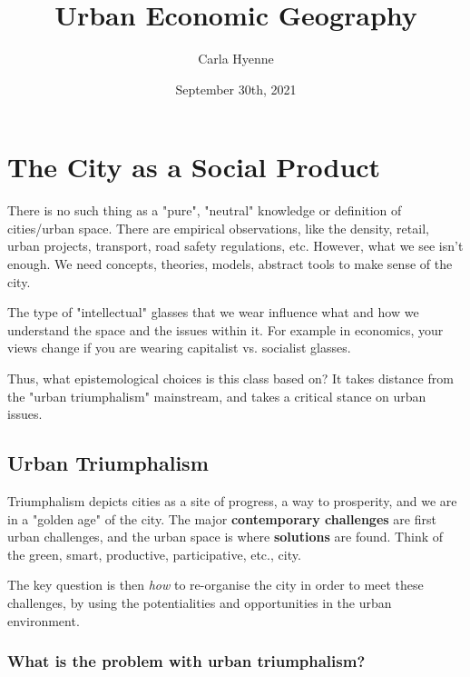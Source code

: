 \documentclass{article}
\title{Urban Economic Geography}
\author{Carla Hyenne }
\begin{document}
\maketitle

\tableofcontents

\pagebreak


\section{The City as a Social Product}
\date{September 30th, 2021}

There is no such thing as a "pure", "neutral" knowledge or definition of cities/urban space. There are empirical observations, like the density, retail, urban projects, transport, road safety regulations, etc. However, what we see isn't enough. We need concepts, theories, models, abstract tools to make sense of the city.

The type of "intellectual" glasses that we wear influence what and how we understand the space and the issues within it. For example in economics, your views change if you are wearing capitalist vs. socialist glasses.

Thus, what epistemological choices is this class based on? It takes distance from the "urban triumphalism" mainstream, and takes a critical stance on urban issues. 

\subsection{Urban Triumphalism}

Triumphalism depicts cities as a site of progress, a way to prosperity, and we are in a "golden age" of the city. The major \textbf{contemporary challenges} are first urban challenges, and the urban space is where \textbf{solutions} are found. Think of the green, smart, productive, participative, etc., city. 

The key question is then \textit{how} to re-organise the city in order to meet these challenges, by using the potentialities and opportunities in the urban environment. 

\subsubsection{What is the problem with urban triumphalism?}
\end{document}
